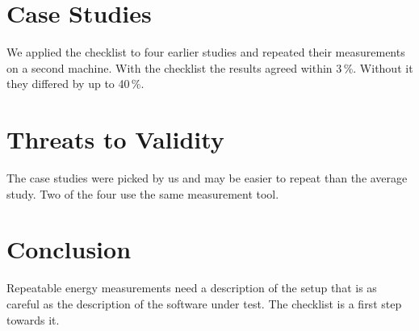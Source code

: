\documentclass[acmsmall,review,anonymous]{acmart}
\begin{document}
\section{Case Studies}

We applied the checklist to four earlier studies and repeated their
measurements on a second machine. With the checklist the results agreed
within 3\,\%. Without it they differed by up to 40\,\%.

\section{Threats to Validity}

The case studies were picked by us and may be easier to repeat than the
average study. Two of the four use the same measurement tool.

\section{Conclusion}

Repeatable energy measurements need a description of the setup that is as
careful as the description of the software under test. The checklist is a
first step towards it.
\end{document}
